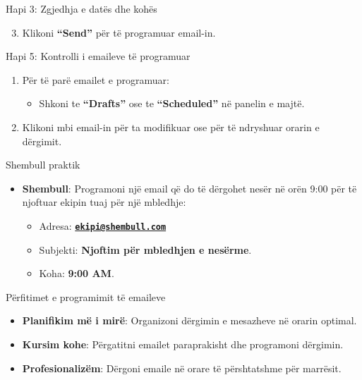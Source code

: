 \documentclass[
  ignorenonframetext,
]{beamer}
\providecommand{\tightlist}{%
  \setlength{\itemsep}{0pt}\setlength{\parskip}{0pt}}
\begin{document}
\begin{frame}{Hapi 3: Zgjedhja e datës dhe kohës}
\label{hapi-3-zgjedhja-e-datuxebs-dhe-kohuxebs-1}
\begin{enumerate}
\setcounter{enumi}{2}
\tightlist
\item
  Klikoni \textbf{``Send''} për të programuar email-in.
\end{enumerate}
\end{frame}

\begin{frame}{Hapi 5: Kontrolli i emaileve të programuar}
\label{hapi-5-kontrolli-i-emaileve-tuxeb-programuar}
\begin{enumerate}
\item
  Për të parë emailet e programuar:

  \begin{itemize}
  \tightlist
  \item
    Shkoni te \textbf{``Drafts''} ose te \textbf{``Scheduled''} në
    panelin e majtë.
  \end{itemize}
\item
  Klikoni mbi email-in për ta modifikuar ose për të ndryshuar orarin e
  dërgimit.
\end{enumerate}
\end{frame}

\begin{frame}{Shembull praktik}
\label{shembull-praktik-1}
\begin{itemize}
\item
  \textbf{Shembull}: Programoni një email që do të dërgohet nesër në
  orën 9:00 për të njoftuar ekipin tuaj për një mbledhje:

  \begin{itemize}
  \item
    Adresa:
    \textbf{\href{mailto:ekipi@shembull.com}{\nolinkurl{ekipi@shembull.com}}}
  \item
    Subjekti: \textbf{Njoftim për mbledhjen e nesërme}.
  \item
    Koha: \textbf{9:00 AM}.
  \end{itemize}
\end{itemize}
\end{frame}

\begin{frame}{Përfitimet e programimit të emaileve}
\label{puxebrfitimet-e-programimit-tuxeb-emaileve}
\begin{itemize}
\item
  \textbf{Planifikim më i mirë}: Organizoni dërgimin e mesazheve në
  orarin optimal.
\item
  \textbf{Kursim kohe}: Përgatitni emailet paraprakisht dhe programoni
  dërgimin.
\item
  \textbf{Profesionalizëm}: Dërgoni emaile në orare të përshtatshme për
  marrësit.
\end{itemize}
\end{frame}
\end{document}
